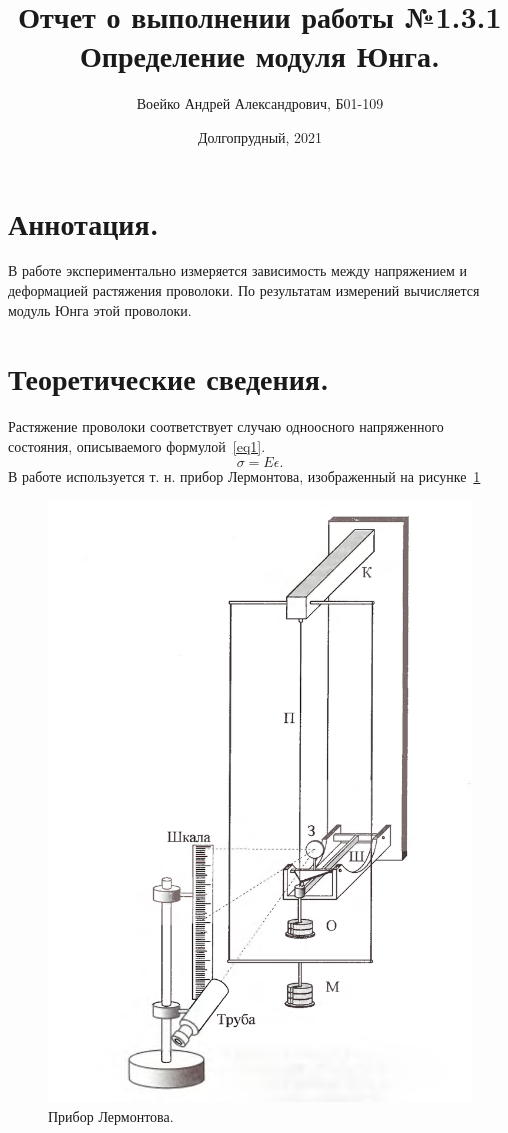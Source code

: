 \documentclass[a4paper,11pt]{article}
\title{Отчет о выполнении работы №1.3.1\\Определение модуля Юнга.}
\author{Воейко Андрей Александрович, Б01-109}
\date{Долгопрудный, 2021}
\begin{document}
\maketitle
\newpage
\section{Аннотация.}
В работе экспериментально измеряется зависимость между напряжением и деформацией растяжения проволоки. По результатам измерений вычисляется модуль Юнга этой проволоки.
\section{Теоретические сведения.}
Растяжение проволоки соответствует случаю одноосного напряженного состояния, описываемого формулой~\ref{eq1}.
\begin{equation}    \label{eq1}
  \sigma = E \epsilon.
\end{equation}
В работе используется т. н. прибор Лермонтова, изображенный на рисунке~\ref{fig:img1}
\begin{figure}
  \includegraphics[scale = 0.3]{pic1.png}
  \caption{Прибор Лермонтова.}
  \label{fig:img1}
\end{figure}
\end{document}
